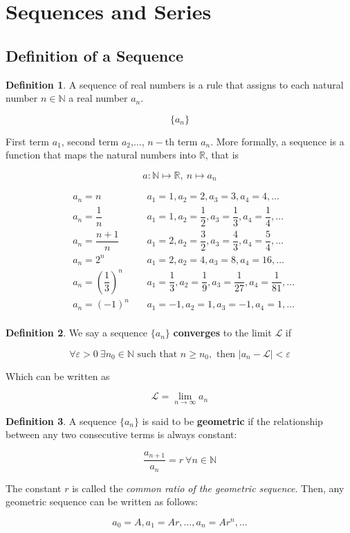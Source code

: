 \documentclass[a4paper,11pt]{article}
\theoremstyle{definition}
\newtheorem{definition}{Definition}
\theoremstyle{plain}
\begin{document}
\section{Sequences and Series}\label{sequences-and-series}

\subsection{Definition of a Sequence}
\begin{definition}
A sequence of real numbers is a rule that assigns to each natural number $n\in \mathbb{N}$ a real number $a_n$.

\[
\{a_n\}
\]

First term $a_1$, second term $a_2$,$\ldots$, $n-$th term $a_n$. More formally, a sequence is a function that maps the natural numbers into $\mathbb{R}$, that is

\[
a : \mathbb{N} \mapsto \mathbb{R}, \ n \mapsto a_n
\]
\end{definition}

\begin{align*}
& a_n = n & \ & a_1=1, a_2=2,  a_3=3,  a_4 = 4,  \ldots \\ 
& a_n = \dfrac{1}{n} & \ & a_1=1, a_2=\dfrac{1}{2},  a_3=\dfrac{1}{3},  a_4 = 
\dfrac{1}{4},  \ldots \\
& a_n= \dfrac{n+1}{n} & \ & a_1=2, a_2=\dfrac{3}{2},  a_3=\dfrac{4}{3},  a_4 = 
\dfrac{5}{4},  \ldots \\
& a_n = 2^n & \ & a_1=2, a_2=4,  a_3=8,  a_4 = 16,  \ldots \\
& a_n = \left( \dfrac{1}{3} \right)^n & \ & a_1=\dfrac{1}{3}, a_2=\dfrac{1}{9},  
a_3=\dfrac{1}{27},  a_4 = \dfrac{1}{81},  \ldots \\
& a_n = (-1)^n & \ & a_1=-1, a_2=1,  a_3=-1,  a_4 = 1,  \ldots \\
\end{align*}

\begin{definition}
We say a sequence $\{a_n\}$ \textbf{converges} to the limit $\mathcal{L}$ if 

\[
\forall \varepsilon > 0 \ \exists n_0 \in \mathbb{N} \text{ such that } n\geq n_0, \text{ then } \lvert a_n - \mathcal{L} \rvert < \varepsilon
\]

Which can be written as

\[
\mathcal{L} = \lim_{n\rightarrow\infty} a_n
\]
\end{definition}


\begin{definition}
A sequence $\{a_n\}$ is said to be \textbf{geometric} if the relationship between any two consecutive terms is always constant:

\[
\frac{a_{n+1}}{a_n} = r \ \forall n\in\mathbb{N}
\]

The constant $r$ is called the \textit{common ratio of the geometric sequence}. Then, any geometric sequence can be written as follows:

\[
a_0 = A, a_1 = Ar, \ldots, a_n = Ar^n, \ldots
\]
\end{definition}
\end{document}
